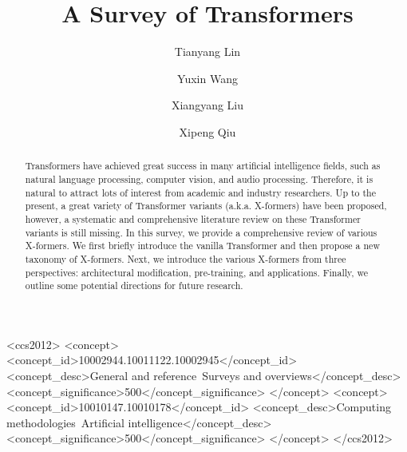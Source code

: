 \documentclass[manuscript,acmsmall,screen,nonacm]{acmart}
\theoremstyle{definition}
\begin{document}
\title{A Survey of Transformers}

\author{Tianyang Lin}
\author{Yuxin Wang}
\author{Xiangyang Liu}
\author{Xipeng Qiu}


\renewcommand{\shortauthors}{Lin et al.}

\begin{abstract}
  Transformers have achieved great success in many artificial intelligence fields, such as natural language processing, computer vision, and audio processing. Therefore, it is natural to attract lots of interest from academic and industry researchers. Up to the present, a great variety of Transformer variants (a.k.a. X-formers) have been proposed, however, a systematic and comprehensive literature review on these Transformer variants is still missing. In this survey, we provide a comprehensive review of various X-formers. We first briefly introduce the vanilla Transformer and then propose a new taxonomy of X-formers. Next, we introduce the various X-formers from three perspectives: architectural modification, pre-training, and applications. Finally, we outline some potential directions for future research.
\end{abstract}

\begin{CCSXML}
<ccs2012>
   <concept>
       <concept_id>10002944.10011122.10002945</concept_id>
       <concept_desc>General and reference~Surveys and overviews</concept_desc>
       <concept_significance>500</concept_significance>
       </concept>
   <concept>
       <concept_id>10010147.10010178</concept_id>
       <concept_desc>Computing methodologies~Artificial intelligence</concept_desc>
       <concept_significance>500</concept_significance>
       </concept>
 </ccs2012>
\end{CCSXML}
\end{document}
